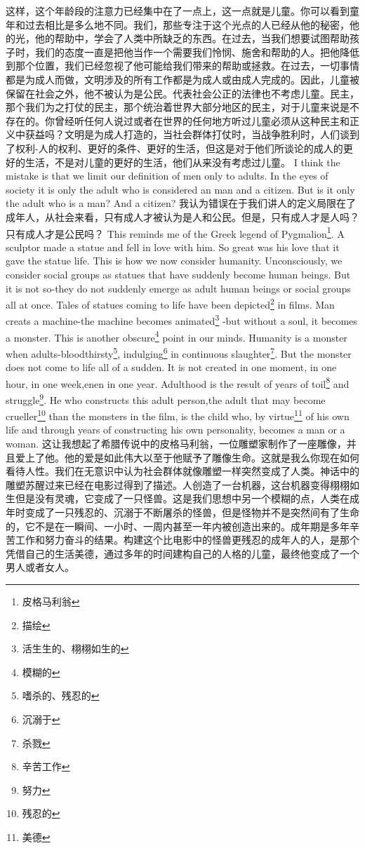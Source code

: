 \documentclass[lang=cn,10pt]{elegantbook}
\begin{document}
这样，这个年龄段的注意力已经集中在了一点上，这一点就是儿童。你可以看到童年和过去相比是多么地不同。我们，那些专注于这个光点的人已经从他的秘密，他的光，他的帮助中，学会了人类中所缺乏的东西。在过去，当我们想要试图帮助孩子时，我们的态度一直是把他当作一个需要我们怜悯、施舍和帮助的人。把他降低到那个位置，我们已经忽视了他可能给我们带来的帮助或拯救。在过去，一切事情都是为成人而做，文明涉及的所有工作都是为成人或由成人完成的。因此，儿童被保留在社会之外，他不被认为是公民。代表社会公正的法律也不考虑儿童。民主，那个我们为之打仗的民主，那个统治着世界大部分地区的民主，对于儿童来说是不存在的。你曾经听任何人说过或者在世界的任何地方听过儿童必须从这种民主和正义中获益吗？文明是为成人打造的，当社会群体打仗时，当战争胜利时，人们谈到了权利-人的权利、更好的条件、更好的生活，但这是对于他们所谈论的成人的更好的生活，不是对儿童的更好的生活，他们从来没有考虑过儿童。
I think the mistake is that we limit our definition of men only to adults. In the eyes of society it is only the adult who is considered an man and a citizen. But is it only the adult who is a man? And a citizen?
我认为错误在于我们讲人的定义局限在了成年人，从社会来看，只有成人才被认为是人和公民。但是，只有成人才是人吗？只有成人才是公民吗？
This reminds me of the Greek legend of Pygmalion\footnote{皮格马利翁}. A sculptor made a statue and fell in love with him. So great was his love that it gave the statue life. This is how we now consider humanity. Unconsciously, we consider social groups as statues that have suddenly become human beings. But it is not so-they do not suddenly emerge as adult human beings or social groups all at once. Tales of statues coming to life have been depicted\footnote{描绘} in films. Man creats a machine-the machine becomes animated\footnote{活生生的、栩栩如生的} -but without a soul, it becomes a monster. This is another obscure\footnote{模糊的} point in our minds. Humanity is a monster when adults-bloodthirsty\footnote{嗜杀的、残忍的}, indulging\footnote{沉溺于} in continuous slaughter\footnote{杀戮}. But the monster does not come to life all of a sudden. It is not created in one moment, in one hour, in one week,enen in one year. Adulthood is the result of years of toil\footnote{辛苦工作} and struggle\footnote{努力}. He who constructs this adult person,the adult that may become crueller\footnote{残忍的} than the monsters in the film, is the child who, by virtue\footnote{美德} of his own life and through years of constructing his own personality, becomes a man or a woman.
这让我想起了希腊传说中的皮格马利翁，一位雕塑家制作了一座雕像，并且爱上了他。他的爱是如此伟大以至于他赋予了雕像生命。这就是我么你现在如何看待人性。我们在无意识中认为社会群体就像雕塑一样突然变成了人类。神话中的雕塑苏醒过来已经在电影过得到了描述。人创造了一台机器，这台机器变得栩栩如生但是没有灵魂，它变成了一只怪兽。这是我们思想中另一个模糊的点，人类在成年时变成了一只残忍的、沉溺于不断屠杀的怪兽，但是怪物并不是突然间有了生命的，它不是在一瞬间、一小时、一周内甚至一年内被创造出来的。成年期是多年辛苦工作和努力奋斗的结果。构建这个比电影中的怪兽更残忍的成年人的人，是那个凭借自己的生活美德，通过多年的时间建构自己的人格的儿童，最终他变成了一个男人或者女人。
\end{document}
